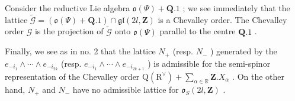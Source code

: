 Consider the reductive Lie algebra \(\mathfrak{o}(\varPsi) + \mathbf{Q}.1\) ; we see immediately that the lattice \(\tilde{\mathcal{G}} = (\mathfrak{o}(\varPsi) + \mathbf{Q}.1) \cap \mathfrak{gl}(2l, \mathbf{Z})\) is a Chevalley order. The Chevalley order \(\mathcal{G}\) is the projection of \(\tilde{\mathcal{G}}\) onto \(\mathfrak{o}(\varPsi)\) parallel to the centre \(\mathbf{Q}.1\) .

Finally, we see as in no. 2 that the lattice \(N_{+}\) (resp. \(N_{-}\) ) generated by the \(e_{-i_{1}}\wedge\cdots\wedge e_{-i_{2k}}\) (resp. \(e_{-i_{1}}\wedge\cdots\wedge e_{-i_{2k+1}}\) ) is admissible for the semi-spinor representation of the Chevalley order \(\mathrm{Q}(\mathrm{R}^{\vee})+\sum_{\alpha\in\mathbb{R}}\mathbf{Z}.X_{\alpha}\) . On the other hand, \(N_{+}\) and \(N_{-}\) have no admissible lattice for \(\mathfrak{o}_{S}(2l,\mathbf{Z})\) .

